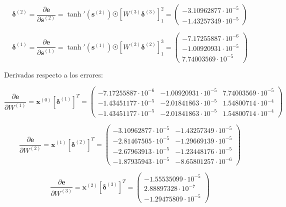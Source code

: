 \documentclass{article}
\begin{document}
\[\boldsymbol{\delta}^{(2)}=\frac{\partial\textbf{e}}{\partial\textbf{s}^{(2)}}=\tanh'(\textbf{s}^{(2)})\astrosun[W^{(3)}\boldsymbol{\delta}^{(3)}]_1^2=\begin{pmatrix} -3.10962877\cdot 10^{-5} \\ -1.43257349\cdot 10^{-5} \end{pmatrix}\]

\[\boldsymbol{\delta}^{(1)}=\frac{\partial\textbf{e}}{\partial\textbf{s}^{(1)}}=\tanh'(\textbf{s}^{(1)})\astrosun[W^{(2)}\boldsymbol{\delta}^{(2)}]_1^3=\begin{pmatrix} -7.17255887\cdot 10^{-6} \\ -1.00920931\cdot 10^{-5} \\ 7.74003569\cdot 10^{-5}\end{pmatrix}\]

Derivadas respecto a los errores:

\[\frac{\partial\textbf{e}}{\partial W^{(1)}}=\textbf{x}^{(0)}[\boldsymbol{\delta}^{(1)}]^T=\begin{pmatrix} -7.17255887\cdot 10^{-6} & -1.00920931\cdot 10^{-5} & 7.74003569\cdot 10^{-5} \\
    -1.43451177\cdot 10^{-5} & -2.01841863\cdot 10^{-5} & 1.54800714\cdot 10^{-4} \\ -1.43451177\cdot 10^{-5} & -2.01841863\cdot 10^{-5} & 1.54800714\cdot 10^{-4} \end{pmatrix}\]

\[\frac{\partial\textbf{e}}{\partial W^{(2)}}=\textbf{x}^{(1)}[\boldsymbol{\delta}^{(2)}]^T=\begin{pmatrix} -3.10962877\cdot 10^{-5} & -1.43257349\cdot 10^{-5} \\
       -2.81467505\cdot 10^{-5} & -1.29669139\cdot 10^{-5} \\
       -2.67963913\cdot 10^{-5} & -1.23448176\cdot 10^{-5} \\
       -1.87935943\cdot 10^{-5} & -8.65801257\cdot 10^{-6}
     \end{pmatrix}\]

\[\frac{\partial\textbf{e}}{\partial W^{(3)}}=\textbf{x}^{(2)}[\boldsymbol{\delta}^{(3)}]^T=\begin{pmatrix} -1.55535099\cdot 10^{-5} \\
       2.88897328\cdot 10^{-7} \\
       -1.29475809\cdot 10^{-5} 
  \end{pmatrix}\]
\end{document}
